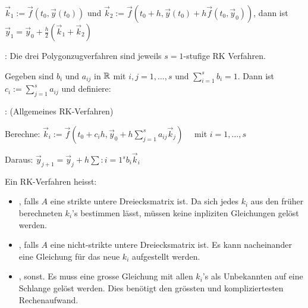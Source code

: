 $\vec{k}_1 := \vec{f}(t_0 , \vec{y} (t_0))$ und
$\vec{k}_2 := \vec{f}(t_0 + h , \vec{y}(t_0) + h \vec{f}(t_0, \vec{y}_0))$,
dann ist $\vec{y}_1 = \vec{y}_0 + \frac{h}{2} (\vec{k}_1 + \vec{k}_2)$

\vspace{1\baselineskip}

: Die drei Polygonzugverfahren sind jeweils $s=1$-stufige RK
Verfahren.

\vspace{1\baselineskip}


Gegeben sind $b_i$ und $a_{ij}$ in $\mathbb{R}$ mit $i,j = 1,\dots,s$ und $\sum_{i=1}^s b_i = 1$.
Dann ist $c_i := \sum_{j=1}^s a_{ij}$ und definiere:

\vspace{1\baselineskip}

: (Allgemeines RK-Verfahren)

Berechne: $\vec{k}_i := \vec{f}(t_0 + c_i h , \vec{y}_0 + h \sum_{j=1}^s a_{ij} \vec{k}_j)$
\ \ mit $i=1,\dots,s$

Daraus: $\vec{y}_{j+1} = \vec{y}_j + h \sum:{i=1}^s b_i \vec{k}_i$

\vspace{1\baselineskip}


Ein RK-Verfahren heisst:
\begin{itemize}
    \item {}, falls $A$ eine strikte untere Dreiecksmatrix ist. Da sich jedes
        $k_i$ aus den früher berechneten $k_i$'s bestimmen lässt, müssen keine inpliziten
        Gleichungen gelöst werden.
    \item {}, falls $A$ eine nicht-strikte untere Dreiecksmatrix ist.
        Es kann nacheinander eine Gleichung für das neue $k_i$ aufgestellt werden.
    \item {}, sonst. Es muss eine grosse Gleichung mit allen $k_i$'s als
        Unbekannten auf eine Schlange gelöst werden. Dies benötigt den grössten und
        kompliziertesten Rechenaufwand.
\end{itemize}


